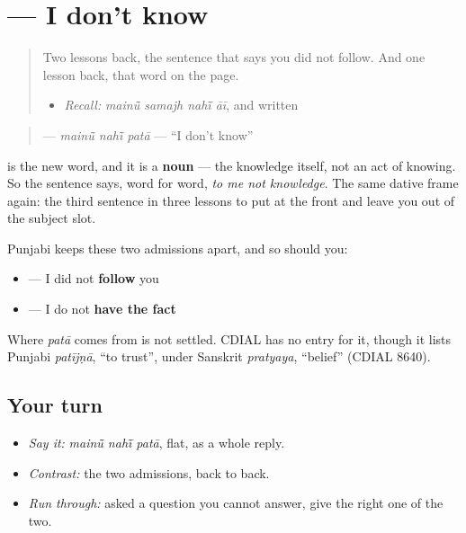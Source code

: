 \section[\texorpdfstring{\pa{ਮੈਨੂੰ} \pa{ਨਹੀਂ} \pa{ਪਤਾ} (mainū̃ nahī̃ patā)}{ਮੈਨੂੰ ਨਹੀਂ ਪਤਾ (mainū̃ nahī̃ patā)}]{   — I don't know}

\label{lesson:PA-C37-nahin-pata}



\begin{quote}
Two lessons back, the sentence that says you did not follow. And one lesson back, that word on the page.

\begin{itemize}
\raggedright
  \item \emph{Recall:} \emph{mainū̃ samajh nahī̃ āī}, and \textbf{} written
\end{itemize}
\end{quote}

\begin{cousinweb}
\begin{quote}
\textbf{  } — \emph{mainū̃ nahī̃ patā} — \textquotedblleft{}I don't know\textquotedblright{}
\end{quote}

\textbf{} is the new word, and it is a \textbf{noun} — the knowledge itself, not an act of knowing. So the sentence says, word for word, \emph{to me not knowledge}. The same dative frame again: the third sentence in three lessons to put \textbf{} at the front and leave you out of the subject slot.

Punjabi keeps these two admissions apart, and so should you:

\begin{itemize}
\raggedright
  \item \textbf{   } — I did not \textbf{follow} you
  \item \textbf{  } — I do not \textbf{have the fact}
\end{itemize}

Where \emph{patā} comes from is not settled. CDIAL has no entry for it, though it lists Punjabi \emph{patījṇā}, \textquotedblleft{}to trust\textquotedblright{}, under Sanskrit \emph{pratyaya}, \textquotedblleft{}belief\textquotedblright{} (CDIAL 8640).
\end{cousinweb}

\subsection*{Your turn}
\begin{itemize}
\raggedright
  \item \emph{Say it:} \emph{mainū̃ nahī̃ patā}, flat, as a whole reply.
  \item \emph{Contrast:} the two admissions, back to back.
  \item \emph{Run through:} asked a question you cannot answer, give the right one of the two.
\end{itemize}

